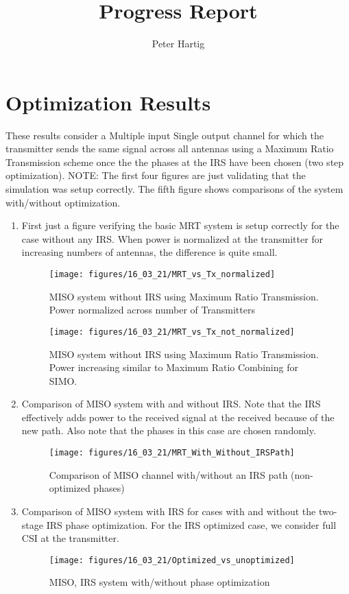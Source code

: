 \documentclass[12pt,a4paper]{article}
\title{Progress Report}
\author{Peter Hartig}
\begin{document}
\maketitle
\tableofcontents

\section{Optimization Results}\label{overview}
These results consider a Multiple input Single output channel for which the transmitter sends the same signal across all antennas using a Maximum Ratio Transmission scheme once the the phases at the IRS have been chosen (two step optimization).
NOTE: The first four figures are just validating that the simulation was setup correctly. The fifth figure shows comparisons of the system with/without optimization.
\begin{enumerate}
\item 
First just a figure verifying the basic MRT system is setup correctly for the case without any IRS.
When power is normalized at the transmitter for increasing numbers of antennas, the difference is quite small. 
	\begin{figure}[H]
	\texttt{[image: figures/16\_03\_21/MRT\_vs\_Tx\_normalized]}
	  \caption{MISO system without IRS using Maximum Ratio Transmission. Power normalized across number of Transmitters}
	  \label{basic_MRT}
	\end{figure}
		\begin{figure}[H]
	\texttt{[image: figures/16\_03\_21/MRT\_vs\_Tx\_not\_normalized]}
	  \caption{MISO system without IRS using Maximum Ratio Transmission. Power increasing similar to Maximum Ratio Combining for SIMO.}
	  \label{basic_MRT}
	\end{figure}
	
\item 
Comparison of MISO system with and without IRS. Note that the IRS effectively adds power to the received signal at the received because of the new path.
Also note that the phases in this case are chosen randomly.
	\begin{figure}[H]
	\texttt{[image: figures/16\_03\_21/MRT\_With\_Without\_IRSPath]}
	  \caption{ Comparison of MISO channel with/without an IRS path (non-optimized phases)}
	  \label{AED}
	\end{figure}	
	
\item 
Comparison of MISO system with IRS for cases with and without the two-stage IRS phase optimization. For the IRS optimized case, we consider full CSI at the transmitter.
	\begin{figure}[H]
	\texttt{[image: figures/16\_03\_21/Optimized\_vs\_unoptimized]}
	  \caption{MISO, IRS system with/without phase optimization}
	  \label{AED}
	\end{figure}	


\end{enumerate}
\end{document}

